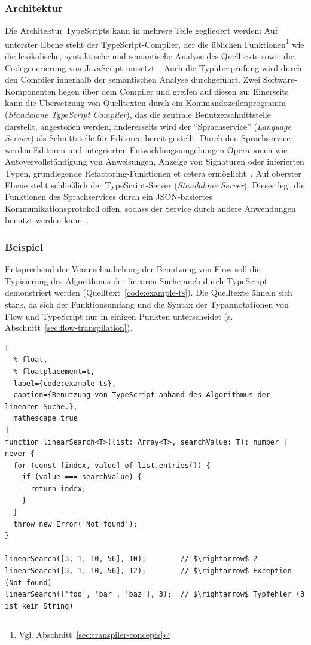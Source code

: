 \subsubsection{Architektur}

Die Architektur TypeScripts kann in mehrere Teile gegliedert werden: Auf unterster Ebene steht der TypeScript-Compiler, der die üblichen Funktionen\footnote{Vgl. Abschnitt~\ref{sec:transpiler-concepts}} wie die lexikalische, syntaktische und semantische Analyse des Quelltexts sowie die Codegenerierung von JavaScript umsetzt~\autocite{TYPESCRIPT:ARCHITECTURE}. Auch die Typüberprüfung wird durch den Compiler innerhalb der semantischen Analyse durchgeführt. Zwei Software-Komponenten liegen über dem Compiler und greifen auf diesen zu: Einerseits kann die Übersetzung von Quelltexten durch ein Kommandozeilenprogramm (\textit{Standalone TypeScript Compiler}), das die zentrale Benutzerschnittstelle darstellt, angestoßen werden, andererseits wird der \enquote{Sprachservice} (\textit{Language Service}) als Schnittstelle für Editoren bereit gestellt. Durch den Sprachservice werden Editoren und integrierten Entwicklungsumgebungen Operationen wie Autovervollständigung von Anweisungen, Anzeige von Signaturen oder inferierten Typen, grundlegende Refactoring-Funktionen et cetera ermöglicht~\autocite{TYPESCRIPT:ARCHITECTURE}. Auf oberster Ebene steht schließlich der TypeScript-Server (\textit{Standalone Server}). Dieser legt die Funktionen des Sprachservices durch ein JSON-basiertes Kommunikationsprotokoll offen, sodass der Service durch andere Anwendungen benutzt werden kann~\autocite{TYPESCRIPT:TSSERVER}.

\subsubsection{Beispiel}

Entsprechend der Veranschaulichung der Benutzung von Flow soll die Typisierung des Algorithmus der linearen Suche auch durch TypeScript demonstriert werden (Quelltext~\ref{code:example-ts}). Die Quelltexte ähneln sich stark, da sich der Funktionsumfang und die Syntax der Typannotationen von Flow und TypeScript nur in einigen Punkten unterscheidet (s. Abschnitt~\ref{sec:flow-transpilation}).

\begin{lstlisting}[
  % float,
  % floatplacement=t,
  label={code:example-ts},
  caption={Benutzung von TypeScript anhand des Algorithmus der linearen Suche.},
  mathescape=true
]
function linearSearch<T>(list: Array<T>, searchValue: T): number | never {
  for (const [index, value] of list.entries()) {
    if (value === searchValue) {
      return index;
    }
  }
  throw new Error('Not found');
}

linearSearch([3, 1, 10, 56], 10);        // $\rightarrow$ 2
linearSearch([3, 1, 10, 56], 12);        // $\rightarrow$ Exception (Not found)
linearSearch(['foo', 'bar', 'baz'], 3);  // $\rightarrow$ Typfehler (3 ist kein String)
\end{lstlisting}


